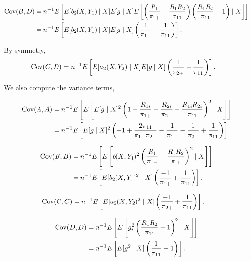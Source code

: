 \begin{itemize}
    \begin{align*}
      {\text{Cov}}(B, D) &= n^{-1} E\left[ E[b_2(X, Y_1) \mid X] E[g \mid X]
      E\left[\left(\frac{R_1}{\pi_{1+}} - \frac{R_1 R_2}{\pi_{11}}\right)
      \left(\frac{R_1 R_2}{\pi_{11}} - 1\right) \mid X\right] \right]\\
      &= n^{-1} E\left[ E[b_2(X, Y_1) \mid X] E[g \mid X]
      \left(\frac{1}{\pi_{1+}} - \frac{1}{\pi_{11}}\right)\right].
    \end{align*}

    By symmetry,
    \begin{align*}
      {\text{Cov}}(C, D) 
      &= n^{-1} E\left[ E[a_2(X, Y_2) \mid X] E[g \mid X]
      \left(\frac{1}{\pi_{2+}} - \frac{1}{\pi_{11}}\right)\right].
    \end{align*}

    We also compute the variance terms,

    \begin{align*}
      {\text{Cov}}(A, A) &= n^{-1} E\left[ E\left[ E[g \mid X]^2 \left(1
      - \frac{R_{1i}}{\pi_{1+}} - \frac{R_{2i}}{\pi_{2+}} +
      \frac{R_{1i}R_{2i}}{\pi_{11}}\right)^2 \mid X\right] \right]\\
      &= n^{-1} E \left[ E[g \mid X]^2 \left(-1 + \frac{2 \pi_{11}}{\pi_{1+}
      \pi_{2+}} - \frac{1}{\pi_{1+}} - \frac{1}{\pi_{2+}} +
      \frac{1}{\pi_{11}}\right)\right].
    \end{align*}

    \begin{align*}
      {\text{Cov}}(B, B) &= n^{-1} E\left[ E\left[b(X, Y_1)^2 \left(\frac{R_1}{\pi_{1+}}
      - \frac{R_1 R_2}{\pi_{11}}\right)^2 \mid X\right] \right]\\
      &= n^{-1} E\left[ E[b_2(X, Y_1)^2 \mid X] \left(\frac{-1}{\pi_{1+}} +
      \frac{1}{\pi_{11}}\right)\right].
    \end{align*}
    
    \begin{align*}
      {\text{Cov}}(C, C) &= n^{-1} E\left[ E[a_2(X, Y_2)^2 \mid X]
      \left(\frac{-1}{\pi_{2+}} + \frac{1}{\pi_{11}}\right) \right].
    \end{align*}

    \begin{align*}
      {\text{Cov}}(D, D) &= n^{-1} E\left[ E\left[g_i^2 \left(\frac{R_1 R_2}{\pi_{11}} -
      1\right)^2 \mid X\right] \right]\\
      &= n^{-1} E\left[ E[g^2 \mid X] \left(\frac{1}{\pi_{11}} -
      1\right)\right].
    \end{align*}


\end{itemize}
